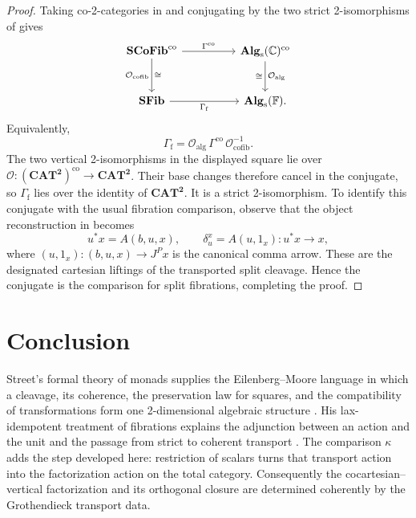 \documentclass[11pt]{article}
\theoremstyle{plain}
\theoremstyle{definition}
\theoremstyle{remark}
\newcommand{\CAT}{\mathbf{CAT}}
\newcommand{\SCoFib}{\mathbf{SCoFib}}
\newcommand{\SFib}{\mathbf{SFib}}
\newcommand{\Alg}{\mathbf{Alg}_{\mathrm{s}}}
\newcommand{\C}{\mathbb{C}}
\numberwithin{equation}{section}
\begin{document}
\begin{proof}
Taking co-2-categories in  and conjugating by the two
strict 2-isomorphisms of  gives
\begin{equation*}
\begin{tikzcd}[column sep=huge,row sep=large]
\SCoFib^{\mathrm{co}} \arrow[r,"\Gamma^{\mathrm{co}}"]
  \arrow[d,"{\mathcal O_{\mathrm{cofib}}}"',"\cong"]
& \Alg(\C)^{\mathrm{co}}
  \arrow[d,"{\mathcal O_{\mathrm{alg}}}","\cong"'] \\
\SFib \arrow[r,"\Gamma_{\mathrm f}"']
& \Alg(\mathbb F).
\end{tikzcd}
\end{equation*}
Equivalently,
\begin{equation*}
  \Gamma_{\mathrm f}
  =\mathcal O_{\mathrm{alg}}\,
   \Gamma^{\mathrm{co}}\,
   \mathcal O_{\mathrm{cofib}}^{-1}.
\end{equation*}
The two vertical 2-isomorphisms in the displayed square lie over
$\mathcal O\colon(\CAT^{\mathbf 2})^{\mathrm{co}}
\to\CAT^{\mathbf 2}$.  Their base changes therefore cancel in the
conjugate, so $\Gamma_{\mathrm f}$ lies over the identity of
$\CAT^{\mathbf 2}$.  It is a strict 2-isomorphism.  To identify this
conjugate
with the usual fibration comparison, observe that the object
reconstruction in
 becomes
\begin{equation*}
  u^{*}x=A(b,u,x),
  \qquad
  \delta^{x}_{u}=A(u,1_x)\colon u^{*}x\longrightarrow x,
\end{equation*}
where $(u,1_x)\colon(b,u,x)\to J^{P}x$ is the canonical comma arrow.
These are the designated cartesian liftings of the transported split
cleavage.  Hence the conjugate is the comparison for split fibrations,
completing the proof.
\end{proof}

\section{Conclusion}

Street's formal theory of monads supplies the Eilenberg--Moore language
in which a cleavage, its coherence, the preservation law for squares,
and the compatibility of transformations form one 2-dimensional
algebraic structure \citep{Street1972}.  His lax-idempotent treatment of
fibrations explains the adjunction between an action and the unit and
the passage from strict to coherent transport \citep{Street1980}.  The
comparison $\kappa$ adds the step developed here: restriction of scalars
turns that transport action into the factorization action on the total
category.  Consequently the cocartesian--vertical factorization and its
orthogonal closure are determined coherently by the Grothendieck
transport data.
\end{document}
